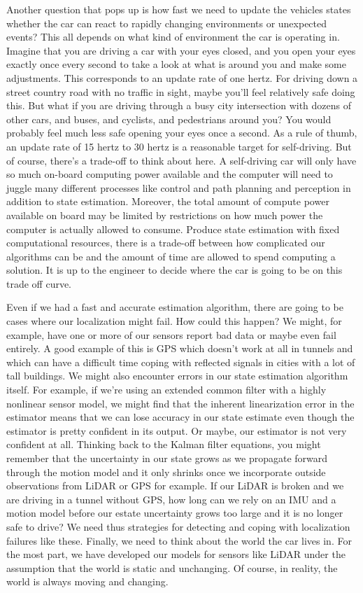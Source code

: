 Another question that pops up is how fast we need to update the vehicles states whether the car can react to rapidly changing environments or unexpected events? This all depends on what kind of environment the car is operating in. Imagine that you are driving a car with your eyes closed, and you open your eyes exactly once every second to take a look at what is around you and make some adjustments. This corresponds to an update rate of one hertz. For driving down a street country road with no traffic in sight, maybe you'll feel relatively safe doing this. But what if you are driving through a busy city intersection with dozens of other cars, and buses, and cyclists, and pedestrians around you? You would probably feel much less safe opening your eyes once a second. As a rule of thumb, an update rate of 15 hertz to 30 hertz is a reasonable target for self-driving. But of course, there's a trade-off to think about here. A self-driving car will only have so much on-board computing power available and the computer will need to juggle many different processes like control and path planning and perception in addition to state estimation. Moreover, the total amount of compute power available on board may be limited by restrictions on how much power the computer is actually allowed to consume. Produce state estimation with fixed computational resources, there is a trade-off between how complicated our algorithms can be and the amount of time are allowed to spend computing a solution. It is up to the engineer to decide where the car is going to be on this trade off curve. 

Even if we had a fast and accurate estimation algorithm, there are going to be cases where our localization might fail. How could this happen? We might, for example, have one or more of our sensors report bad data or maybe even fail entirely. A good example of this is GPS which doesn't work at all in tunnels and which can have a difficult time coping with reflected signals in cities with a lot of tall buildings. We might also encounter errors in our state estimation algorithm itself. For example, if we're using an extended common filter with a highly nonlinear sensor model, we might find that the inherent linearization error in the estimator means that we can lose accuracy in our state estimate even though the estimator is pretty confident in its output. Or maybe, our estimator is not very confident at all. Thinking back to the Kalman filter equations, you might remember that the uncertainty in our state grows as we propagate forward through the motion model and it only shrinks once we incorporate outside observations from LiDAR or GPS for example. If our LiDAR is broken and we are driving in a tunnel without GPS, how long can we rely on an IMU and a motion model before our estate uncertainty grows too large and it is no longer safe to drive? We need thus strategies for detecting and coping with localization failures like these. Finally, we need to think about the world the car lives in. 
For the most part, we have developed our models for sensors like LiDAR under the assumption that the world is static and unchanging. Of course, in reality, the world is always moving and changing. 

